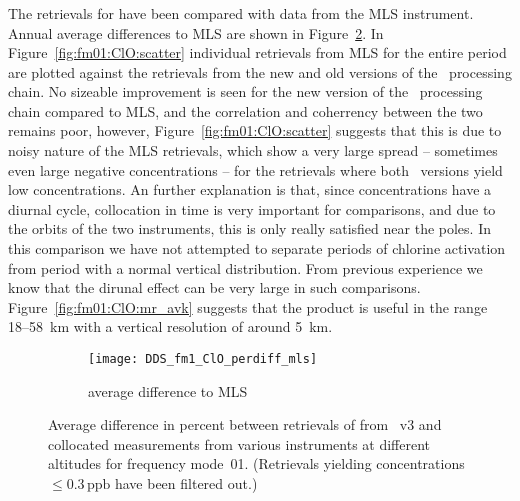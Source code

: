 
\subsubsection{}
\label{sec:fm01:comparison:ClO}
The retrievals for  have been compared with data from the MLS
instrument. Annual average differences to MLS are shown in
Figure~\ref{fig:fm01:ClO:profiles}. In Figure~\ref{fig:fm01:ClO:scatter}
individual retrievals from MLS for the entire period are plotted against the
retrievals from the new and old versions of the \smr\ processing chain. No
sizeable improvement is seen for the new version of the \smr\ processing chain
compared to MLS, and the correlation and coherrency between the two remains
poor, however, Figure~\ref{fig:fm01:ClO:scatter} suggests that this is due to
noisy nature of the MLS retrievals, which show a very large spread -- sometimes
even large negative concentrations -- for the retrievals where both \smr\
versions yield low  concentrations. An further  explanation is
that, since \chem{ClO} concentrations have a diurnal cycle, collocation in time
is very important for comparisons, and due to the orbits of the two
instruments, this is only really satisfied near the poles. In this comparison
we have not attempted to separate periods of chlorine activation from period
with a normal vertical distribution. From previous experience we know that the
dirunal effect can be very large in such comparisons.
Figure~\ref{fig:fm01:ClO:mr_avk} suggests that the product is useful in the
range 18--58~km with a vertical resolution of around 5~km.


\begin{figure}[tbhp]
    \centering
    \begin{subfigure}[b]{0.49\textwidth}
        \texttt{[image: DDS\_fm1\_ClO\_perdiff\_mls]}
        \caption{average difference to MLS}
        \label{fig:fm01:ClO:profiles:MLS}
    \end{subfigure}
    \caption{Average difference in percent between retrievals of 
    from \smr~v3 and collocated measurements from various instruments at
    different altitudes for frequency mode~01. (Retrievals yielding
    concentrations $\leq 0.3\,\mathrm{ppb}$ have been filtered out.)}
    \label{fig:fm01:ClO:profiles}
\end{figure}

